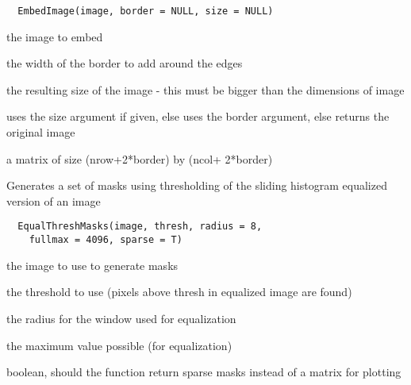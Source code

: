 \documentclass[a4paper]{book}
\begin{document}
%
\begin{Usage}
\begin{verbatim}
  EmbedImage(image, border = NULL, size = NULL)
\end{verbatim}
\end{Usage}
%
\begin{Arguments}
\begin{ldescription}
\item[\code{image}] the image to embed

\item[\code{border}] the width of the border to add around the
edges

\item[\code{size}] the resulting size of the image - this must
be bigger than the dimensions of image
\end{ldescription}
\end{Arguments}
%
\begin{Details}\relax
uses the size argument if given, else uses the border
argument, else returns the original image
\end{Details}
%
\begin{Value}
a matrix of size (nrow+2*border) by (ncol+ 2*border)
\end{Value}
%
\begin{Description}\relax
Generates a set of masks using thresholding of the
sliding histogram equalized version of an image
\end{Description}
%
\begin{Usage}
\begin{verbatim}
  EqualThreshMasks(image, thresh, radius = 8,
    fullmax = 4096, sparse = T)
\end{verbatim}
\end{Usage}
%
\begin{Arguments}
\begin{ldescription}
\item[\code{image}] the image to use to generate masks

\item[\code{thresh}] the threshold to use (pixels above thresh
in equalized image are found)

\item[\code{radius}] the radius for the window used for
equalization

\item[\code{fullmax}] the maximum value possible (for
equalization)

\item[\code{sparse}] boolean, should the function return sparse
masks instead of a matrix for plotting
\end{ldescription}
\end{Arguments}
\end{document}

